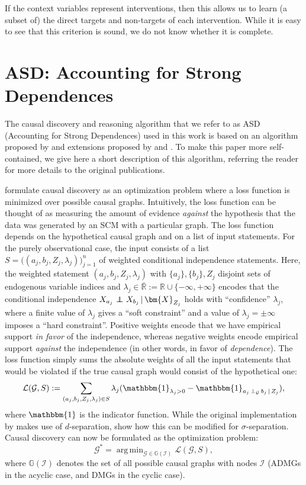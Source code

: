 \documentclass[twoside,11pt]{article}
\DeclareMathOperator*{\argmin}{arg\,min}
\DeclareMathOperator*{\CI}{{\,\perp\mkern-12mu\perp\,}}
\DeclareMathOperator*{\SEP}{\perp}
\newcommand\B[1]{\bm{#1}}
\newcommand\C[1]{\mathcal{#1}}
\newcommand\given{\,|\,}
\newcommand{\RN}{\mathbb{R}}
\newcommand{\I}{\mathbbm{1}}
\begin{document}
If the context variables represent interventions, then this allows us to learn (a subset of) the direct targets and non-targets of each intervention. 
While it is easy to see that this criterion is sound, we do not know whether it is complete.

\section{ASD: Accounting for Strong Dependences}\label{sec:app:asd}

The causal discovery and reasoning algorithm that we refer to as ASD (Accounting for Strong Dependences) used in this
work is based on an algorithm proposed by \citet{HEJ2014} and extensions
proposed by \citet{MagliacaneClaassenMooij_NIPS_16} and \citet{ForreMooij_UAI_18}. To
make this paper more self-contained, we give here a short description of this algorithm,
referring the reader for more details to the original publications.

\citet{HEJ2014} formulate causal discovery as an optimization problem where a
loss function is minimized over possible causal graphs. Intuitively, the loss
function can be thought of as measuring the amount of evidence \emph{against} the
hypothesis that the data was generated by an SCM with a particular graph.
The loss function depends on the hypothetical causal graph and on a list of input statements. 
For the purely observational case, the input consists of a list $S = \big((a_j,b_j,Z_j,\lambda_j)\big)_{j=1}^n$ of 
weighted conditional independence statements. Here, the weighted statement $(a_j,b_j,Z_j,\lambda_j)$
with $\{a_j\},\{b_j\},Z_j$ disjoint sets of endogenous variable indices and 
$\lambda_j \in \bar{\RN} := \RN \cup \{-\infty,+\infty\}$
encodes that the conditional independence $X_{a_j} \CI X_{b_j} \given \B{X}_{Z_j}$ holds
with ``confidence'' $\lambda_j$, where a finite value of $\lambda_j$ gives a ``soft constraint''
and a value of $\lambda_j=\pm\infty$ imposes a ``hard constraint''. Positive weights 
encode that we have empirical support \emph{in favor} of the independence, whereas negative weights
encode empirical support \emph{against} the independence (in other words, in favor of
\emph{dependence}).
The loss function simply sums the absolute weights of all the input statements that would be violated 
if the true causal graph would consist of the hypothetical one:
\begin{equation}\label{eq:loss}
  \mathcal{L}(\C{G}, S) := \sum_{(a_j,b_j,Z_j,\lambda_j)\in S} \lambda_j (\I_{\lambda_j > 0} - \I_{a_j \SEP_{\C{G}} b_j \given Z_j}),
\end{equation}
where $\I$ is the indicator function.
While the original implementation by \citet{HEJ2014} makes use of $d$-separation, \citet{ForreMooij_UAI_18}
show how this can be modified for $\sigma$-separation.
Causal discovery can now be formulated as the optimization problem:
\begin{equation}\label{eq:argmin}
  \C{G}^* = \argmin_{\C{G}\in\mathbb{G}(\C{I})} \mathcal{L}(\C{G}, S),
\end{equation}
where $\mathbb{G}(\C{I})$ denotes the set of all possible causal graphs with nodes $\C{I}$
(ADMGs in the acyclic case, and DMGs in the cyclic case).
\end{document}
